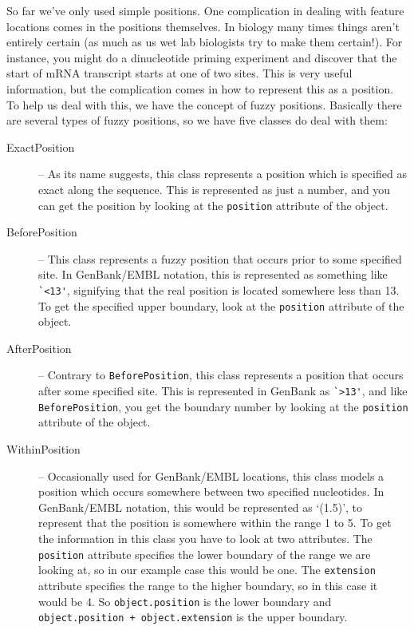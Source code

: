 \documentclass{report}
\begin{document}
So far we've only used simple positions. One complication in dealing
with feature locations comes in the positions themselves.
In biology many times things aren't entirely certain
(as much as us wet lab biologists try to make them certain!). For
instance, you might do a dinucleotide priming experiment and discover
that the start of mRNA transcript starts at one of two sites. This
is very useful information, but the complication comes in how to
represent this as a position. To help us deal with this, we have
the concept of fuzzy positions. Basically there are several types
of fuzzy positions, so we have five classes do deal with them:

\begin{description}
  \item[ExactPosition] -- As its name suggests, this class represents a position which is specified as exact along the sequence. This is represented as just a number, and you can get the position by looking at the \verb|position| attribute of the object.

  \item[BeforePosition] -- This class represents a fuzzy position
  that occurs prior to some specified site. In GenBank/EMBL notation,
  this is represented as something like \verb|`<13'|, signifying that
  the real position is located somewhere less than 13. To get
  the specified upper boundary, look at the \verb|position|
  attribute of the object.

  \item[AfterPosition] -- Contrary to \verb|BeforePosition|, this
  class represents a position that occurs after some specified site.
  This is represented in GenBank as \verb|`>13'|, and like
  \verb|BeforePosition|, you get the boundary number by looking
  at the \verb|position| attribute of the object.

  \item[WithinPosition] -- Occasionally used for GenBank/EMBL locations,
  this class models a position which occurs somewhere between two
  specified nucleotides. In GenBank/EMBL notation, this would be
  represented as `(1.5)', to represent that the position is somewhere
  within the range 1 to 5. To get the information in this class you
  have to look at two attributes. The \verb|position| attribute
  specifies the lower boundary of the range we are looking at, so in
  our example case this would be one. The \verb|extension| attribute
  specifies the range to the higher boundary, so in this case it
  would be 4. So \verb|object.position| is the lower boundary and
  \verb|object.position + object.extension| is the upper boundary.


\end{description}
\end{document}
